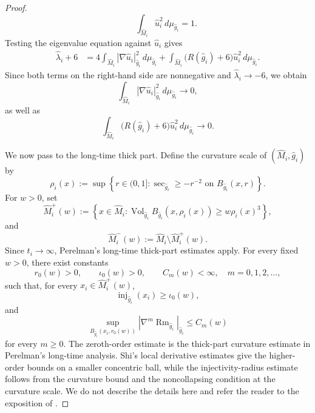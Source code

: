 \documentclass{amsart}
\begin{document}
\begin{proof}
\[        \qquad
        \int_{\widehat M_i}
        \widehat u_i^2\,d\mu_{\widehat g_i}=1.
\]
Testing the eigenvalue equation against \(\widehat u_i\) gives
\[
\begin{aligned}
        \widehat\lambda_i+6
        &=
        4\int_{\widehat M_i}
        |\nabla\widehat u_i|_{\widehat g_i}^2
        \,d\mu_{\widehat g_i}
        +
        \int_{\widehat M_i}
        \bigl(R(\widehat g_i)+6\bigr)
        \widehat u_i^2\,d\mu_{\widehat g_i}.
\end{aligned}
\]
Since both terms on the right-hand side are nonnegative and
\(\widehat\lambda_i\to-6\), we obtain
\begin{equation}
\label{eq:eigenfunction-energy}
        \int_{\widehat M_i}
        |\nabla\widehat u_i|_{\widehat g_i}^2
        \,d\mu_{\widehat g_i}
        \longrightarrow0,
\end{equation}
as well as
\[
        \int_{\widehat M_i}
        \bigl(R(\widehat g_i)+6\bigr)
        \widehat u_i^2\,d\mu_{\widehat g_i}
        \longrightarrow0.
\]

\medskip
\noindent
We now pass to the long-time thick part. Define the curvature scale of
\((\widehat M_i,\widehat g_i)\) by
\[
        \rho_i(x)
        :=
        \sup\left\{
        r\in(0,1]:
        \sec_{\widehat g_i}\geq-r^{-2}
        \text{ on }B_{\widehat g_i}(x,r)
        \right\}.
\]
For \(w>0\), set
\[
        \widehat M_i^+(w)
        :=
        \left\{
        x\in\widehat M_i:
        \operatorname{Vol}_{\widehat g_i}
        B_{\widehat g_i}(x,\rho_i(x))
        \geq
        w\rho_i(x)^3
        \right\},
\]
and
\[
        \widehat M_i^-(w)
        :=
        \widehat M_i\setminus\widehat M_i^+(w).
\]
Since \(t_i\to\infty\), Perelman's long-time thick-part estimates apply.
For every fixed \(w>0\), there exist constants
\[
        r_0(w)>0,
        \qquad
        \iota_0(w)>0,
        \qquad
        C_m(w)<\infty,
        \quad m=0,1,2,\ldots,
\]
such that, for every \(x_i\in\widehat M_i^+(w)\),
\[
        \operatorname{inj}_{\widehat g_i}(x_i)
        \geq\iota_0(w),
\]
and
\[
        \sup_{B_{\widehat g_i}(x_i,r_0(w))}
        |\nabla^m\operatorname{Rm}_{\widehat g_i}|_{\widehat g_i}
        \leq C_m(w)
\]
for every \(m\geq0\). The zeroth-order estimate is the thick-part
curvature estimate in Perelman's long-time analysis. Shi's local
derivative estimates give the higher-order bounds on a smaller
concentric ball, while the injectivity-radius estimate follows from
the curvature bound and the noncollapsing condition at the curvature
scale. We do not describe the details here and refer the reader to the exposition of \cite{cao2006complete}.


\end{proof}
\end{document}
